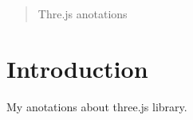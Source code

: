 \documentclass[12pt]{article}
\begin{document}
\maketitle

\begin{abstract}
  Thre.js anotations
\end{abstract}

\section{Introduction}
	My anotations about three.js library.


\end{document}
